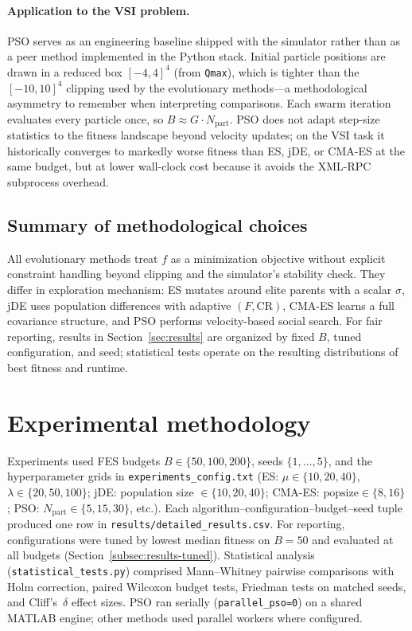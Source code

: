 \documentclass[pdflatex,sn-mathphys-num]{sn-jnl}
\begin{document}
\paragraph{Application to the VSI problem.}
PSO serves as an engineering baseline shipped with the simulator rather than as a peer method implemented in the Python stack.
Initial particle positions are drawn in a reduced box $[-4,4]^4$ (from \texttt{Qmax}), which is tighter than the $[-10,10]^4$ clipping used by the evolutionary methods---a methodological asymmetry to remember when interpreting comparisons.
Each swarm iteration evaluates every particle once, so $B\approx G\cdot N_{\mathrm{part}}$.
PSO does not adapt step-size statistics to the fitness landscape beyond velocity updates; on the VSI task it historically converges to markedly worse fitness than ES, jDE, or CMA-ES at the same budget, but at lower wall-clock cost because it avoids the XML-RPC subprocess overhead.

\subsection{Summary of methodological choices}\label{subsec:algo-summary}

All evolutionary methods treat $f$ as a minimization objective without explicit constraint handling beyond clipping and the simulator's stability check.
They differ in exploration mechanism: ES mutates around elite parents with a scalar $\sigma$, jDE uses population differences with adaptive $(F,\mathrm{CR})$, CMA-ES learns a full covariance structure, and PSO performs velocity-based social search.
For fair reporting, results in Section~\ref{sec:results} are organized by fixed $B$, tuned configuration, and seed; statistical tests operate on the resulting distributions of best fitness and runtime.

\section{Experimental methodology}\label{sec:methodology}

Experiments used FES budgets $B\in\{50,100,200\}$, seeds $\{1,\ldots,5\}$, and the hyperparameter grids in \texttt{experiments\_config.txt} (ES: $\mu\in\{10,20,40\}$, $\lambda\in\{20,50,100\}$; jDE: population size $\in\{10,20,40\}$; CMA-ES: $\mathrm{popsize}\in\{8,16\}$; PSO: $N_{\mathrm{part}}\in\{5,15,30\}$, etc.).
Each algorithm--configuration--budget--seed tuple produced one row in \texttt{results/detailed\_results.csv}.
For reporting, configurations were tuned by lowest median fitness on $B=50$ and evaluated at all budgets (Section~\ref{subsec:results-tuned}).
Statistical analysis (\texttt{statistical\_tests.py}) comprised Mann--Whitney pairwise comparisons with Holm correction, paired Wilcoxon budget tests, Friedman tests on matched seeds, and Cliff's~$\delta$ effect sizes.
PSO ran serially (\texttt{parallel\_pso=0}) on a shared MATLAB engine; other methods used parallel workers where configured.
\end{document}
